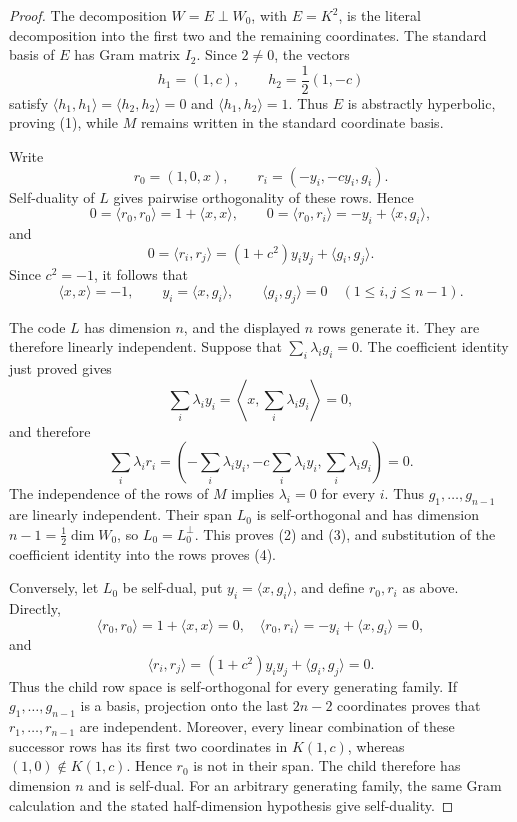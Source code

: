 \documentclass[12pt]{article}
\begin{document}
\begin{proof}
The decomposition \(W=E\perp W_0\), with \(E=K^2\), is
the literal decomposition into the first two and the remaining coordinates.
The standard basis of \(E\) has Gram matrix \(I_2\).  Since \(2\ne0\), the
vectors
\[
h_1=(1,c),\qquad h_2=\frac12(1,-c)
\]
satisfy
\(\langle h_1,h_1\rangle=\langle h_2,h_2\rangle=0\) and
\(\langle h_1,h_2\rangle=1\).  Thus \(E\) is abstractly hyperbolic,
proving (1), while \(M\) remains written in the standard coordinate basis.

Write
\[
r_0=(1,0,x),\qquad r_i=(-y_i,-cy_i,g_i).
\]
Self-duality of \(L\) gives pairwise orthogonality of these rows.  Hence
\[
0=\langle r_0,r_0\rangle=1+\langle x,x\rangle,
\qquad
0=\langle r_0,r_i\rangle=-y_i+\langle x,g_i\rangle,
\]
and
\[
0=\langle r_i,r_j\rangle=(1+c^2)y_iy_j+\langle g_i,g_j\rangle.
\]
Since \(c^2=-1\), it follows that
\[
\langle x,x\rangle=-1,
\qquad
y_i=\langle x,g_i\rangle,
\qquad \langle g_i,g_j\rangle=0
\quad(1\le i,j\le n-1).
\]

The code \(L\) has dimension \(n\), and the displayed \(n\) rows generate it.
They are therefore linearly independent.
Suppose that
\(\sum_i\lambda_i g_i=0\).  The coefficient identity just proved gives
\[
\sum_i\lambda_i y_i
=\left\langle x,\sum_i\lambda_i g_i\right\rangle=0,
\]
and therefore
\[
\sum_i\lambda_i r_i
=\left(-\sum_i\lambda_i y_i,
       -c\sum_i\lambda_i y_i,
       \sum_i\lambda_i g_i\right)=0.
\]
The independence of the rows of \(M\) implies \(\lambda_i=0\) for every
\(i\).  Thus \(g_1,\ldots,g_{n-1}\) are linearly independent.  Their span
\(L_0\) is self-orthogonal and has dimension
\(n-1=\frac12\dim W_0\), so \(L_0=L_0^\perp\).  This proves (2) and (3),
and substitution of the coefficient identity into the rows proves (4).

Conversely, let \(L_0\) be self-dual, put
\(y_i=\langle x,g_i\rangle\), and define \(r_0,r_i\) as above.  Directly,
\[
\langle r_0,r_0\rangle=1+\langle x,x\rangle=0,
\quad
\langle r_0,r_i\rangle=-y_i+\langle x,g_i\rangle=0,
\]
and
\[
\langle r_i,r_j\rangle
=(1+c^2)y_iy_j+\langle g_i,g_j\rangle=0.
\]
Thus the child row space is self-orthogonal for every generating family.
If \(g_1,\ldots,g_{n-1}\) is a basis, projection onto the last
\(2n-2\) coordinates proves that \(r_1,\ldots,r_{n-1}\) are independent.
Moreover, every linear combination of these successor rows has its first
two coordinates in \(K(1,c)\), whereas \((1,0)\notin K(1,c)\).  Hence
\(r_0\) is not in their span.  The child therefore has dimension \(n\) and
is self-dual.  For an arbitrary generating family, the same Gram calculation
and the stated half-dimension hypothesis give self-duality.
\end{proof}
\end{document}
